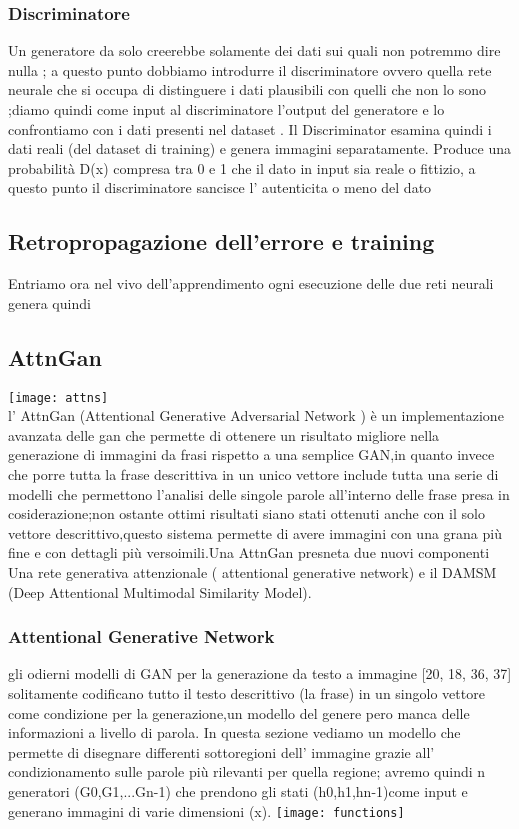 \subsubsection{Discriminatore}
Un  generatore da solo creerebbe solamente dei dati sui quali non potremmo dire nulla ;
a questo punto dobbiamo introdurre il discriminatore ovvero quella rete neurale  che si occupa di distinguere i dati plausibili con quelli che non lo sono ;diamo quindi come input al discriminatore l'output del generatore e lo confrontiamo con i dati presenti nel dataset .
Il Discriminator esamina quindi i dati  reali (del dataset di training) e genera immagini separatamente.
Produce una probabilità D(x) compresa tra 0 e 1 che il dato in input sia reale o fittizio, a questo punto il discriminatore sancisce l' autenticita o meno del dato 

\subsection{Retropropagazione dell'errore e training}
Entriamo ora nel vivo dell'apprendimento ogni esecuzione delle due reti neurali genera quindi 


 \subsection{AttnGan}
 \texttt{[image: attns]} \\
l' AttnGan (Attentional Generative Adversarial Network  ) è un implementazione avanzata delle gan che permette di ottenere un risultato migliore nella generazione di immagini da frasi rispetto a una semplice GAN,in quanto invece che porre tutta la frase descrittiva in un unico vettore  include  tutta una serie di modelli che permettono l'analisi delle singole parole all'interno delle frase presa in cosiderazione;non ostante ottimi risultati siano stati ottenuti anche con il solo vettore descrittivo,questo sistema permette di avere immagini con una grana più fine e con dettagli più versoimili.Una AttnGan presneta due nuovi componenti Una rete generativa attenzionale ( attentional generative network) e il DAMSM (Deep Attentional Multimodal Similarity Model).

\subsubsection{Attentional Generative Network}
gli odierni modelli di GAN per la generazione da testo a immagine  [20, 18, 36, 37] solitamente codificano tutto il testo descrittivo (la frase) in un singolo vettore come condizione per la generazione,un modello del genere pero manca delle informazioni a livello di parola. In questa sezione vediamo un modello che permette di disegnare differenti sottoregioni dell' immagine grazie all' condizionamento sulle parole più rilevanti per quella regione;
avremo quindi n generatori (G0,G1,...Gn-1)
che prendono gli stati (h0,h1,hn-1)come input
e generano immagini di varie dimensioni  (x). 
\texttt{[image: functions]}

